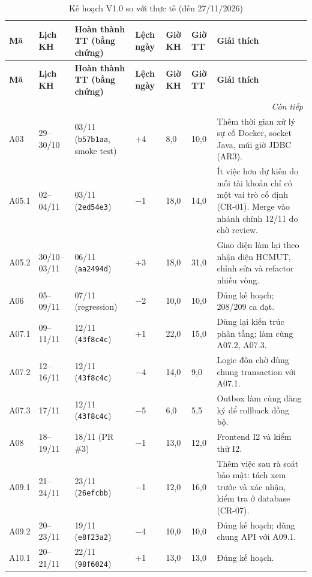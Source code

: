 \begingroup\footnotesize
\renewcommand{\arraystretch}{1.15}
\begin{longtable}{@{}p{.07\linewidth}p{.11\linewidth}p{.20\linewidth}p{.06\linewidth}p{.06\linewidth}p{.06\linewidth}p{.34\linewidth}@{}}
\caption{Kế hoạch V1.0 so với thực tế (đến 27/11/2026)}\label{tab:t3-actual}\\
\toprule
\textbf{Mã} & \textbf{Lịch KH} & \textbf{Hoàn thành TT (bằng chứng)} & \textbf{Lệch ngày} & \textbf{Giờ KH} & \textbf{Giờ TT} & \textbf{Giải thích}\\\midrule\endfirsthead
\toprule
\textbf{Mã} & \textbf{Lịch KH} & \textbf{Hoàn thành TT (bằng chứng)} & \textbf{Lệch ngày} & \textbf{Giờ KH} & \textbf{Giờ TT} & \textbf{Giải thích}\\\midrule\endhead
\midrule\multicolumn{7}{r}{\textit{Còn tiếp}}\\\endfoot
\bottomrule\endlastfoot
A03 & 29--30/10 & 03/11 (\texttt{b57b1aa}, smoke test) & +4 & 8,0 & 10,0 & Thêm thời gian xử lý sự cố Docker, socket Java, múi giờ JDBC (AR3).\\
A05.1 & 02--04/11 & 03/11 (\texttt{2ed54e3}) & $-$1 & 18,0 & 14,0 & Ít việc hơn dự kiến do mỗi tài khoản chỉ có một vai trò cố định (CR-01). Merge vào nhánh chính 12/11 do chờ review.\\
A05.2 & 30/10--03/11 & 06/11 (\texttt{aa2494d}) & +3 & 18,0 & 31,0 & Giao diện làm lại theo nhận diện HCMUT, chỉnh sửa và refactor nhiều vòng.\\
A06 & 05--09/11 & 07/11 (regression) & $-$2 & 10,0 & 10,0 & Đúng kế hoạch; 208/209 ca đạt.\\
A07.1 & 09--11/11 & 12/11 (\texttt{43f8c4c}) & +1 & 22,0 & 15,0 & Dùng lại kiến trúc phân tầng; làm cùng A07.2, A07.3.\\
A07.2 & 12--16/11 & 12/11 (\texttt{43f8c4c}) & $-$4 & 14,0 & 9,0 & Logic đôn chờ dùng chung transaction với A07.1.\\
A07.3 & 17/11 & 12/11 (\texttt{43f8c4c}) & $-$5 & 6,0 & 5,5 & Outbox làm cùng đăng ký để rollback đồng bộ.\\
A08 & 18--19/11 & 18/11 (PR \#3) & $-$1 & 13,0 & 12,0 & Frontend I2 và kiểm thử I2.\\
A09.1 & 21--24/11 & 23/11 (\texttt{26efcbb}) & $-$1 & 12,0 & 16,0 & Thêm việc sau rà soát bảo mật: tách xem trước và xác nhận, kiểm tra ở database (CR-07).\\
A09.2 & 20--23/11 & 19/11 (\texttt{e8f23a2}) & $-$4 & 10,0 & 10,0 & Đúng kế hoạch; dùng chung API với A09.1.\\
A10.1 & 20--21/11 & 22/11 (\texttt{98f6024}) & +1 & 13,0 & 13,0 & Đúng kế hoạch.\\

\end{longtable}
